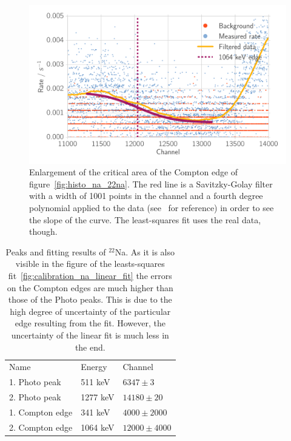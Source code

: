 \begin{figure}[htpb]
    \centering
    \includegraphics[width=0.9\linewidth]{./analysis/figures/histo_na_22na2}
    \caption{Enlargement of the critical area of the Compton edge of
    figure~\ref{fig:histo_na_22na}.     
    The red line is a Savitzky-Golay filter 
    with a width of 1001 points in the channel and a fourth
    degree polynomial applied to the data (see~\cite{scipy} for reference) in order
    to see the slope of the curve. The least-squares fit uses the real data, though.
}
\label{fig:histo_na_22na2}
\end{figure}

\begin{table}[htpb]
    \centering
    \caption{Peaks and fitting results of $^{22}$Na. As it is also visible in the figure
    of the leasts-squares fit~\ref{fig:calibration_na_linear_fit} the errors on the
    Compton edges are much higher than those of the Photo peaks. This is due to the high
    degree of uncertainty of the particular edge resulting from the fit. However, the 
    uncertainty of the linear fit is much less in the end.}
\label{tab:peaks_na_ps}
\begin{tabular}{lll}
    \rowcolor{LightCyan} Name &Energy & Channel \\ 
       1. Photo peak& 511 keV & $6347 \pm 3$ \\ 
       2. Photo peak& 1277 keV & $14180 \pm 20 $\\
       1. Compton edge& 341 keV& $4000 \pm 2000$\\
       2. Compton edge& 1064 keV & $12000 \pm 4000$
    \end{tabular}
\end{table}

